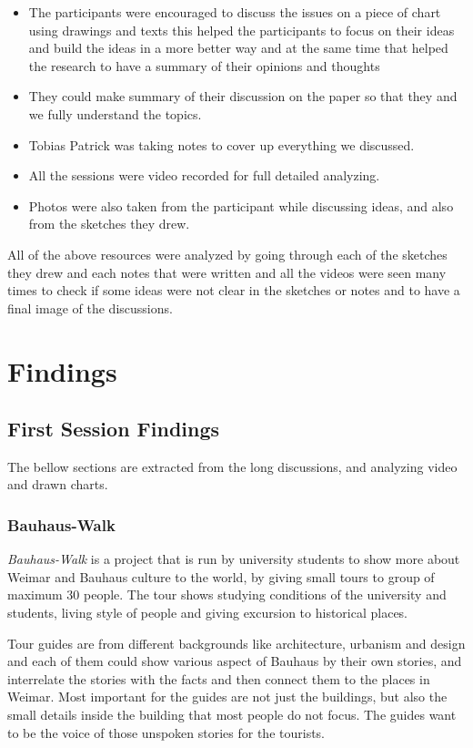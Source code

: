 \begin {itemize}
\item   The participants were encouraged to discuss the issues on a piece of chart using drawings and texts this helped the participants to focus on their ideas and build the ideas in a more better way and at the same time that helped the research to have a summary of their opinions and thoughts 
\item   They could make summary of their discussion on the paper so that they and we fully understand the topics.
\item   Tobias Patrick was taking notes to cover up everything we discussed.
\item   All the sessions were video recorded for full detailed analyzing. 
\item Photos were also taken from the participant while discussing ideas, and also from the sketches they drew.
\end{itemize}


All of the above resources were analyzed by going through each of the sketches they drew and each notes that were written and all the videos were seen many times to check if some ideas were not clear in the sketches or notes and to have a final image of the discussions.


\newpage
\section{Findings}

\subsection {First Session Findings}
The bellow sections are extracted from the long discussions, and analyzing video and drawn charts.


\subsubsection{Bauhaus-Walk}
\emph{Bauhaus-Walk} is a project that is run by university students to show more about Weimar and Bauhaus culture to the world, by giving small tours to group of maximum 30 people. The tour shows studying conditions of the university and students, living style of people and giving excursion to historical places.

Tour guides are from different backgrounds like architecture, urbanism and design and each of them could show various aspect of Bauhaus by their own stories, and interrelate the stories with the facts and then connect them to the places in Weimar. Most important for the guides are not just the buildings, but also the small details inside the building that most people do not focus. The guides want to be the voice of those unspoken stories for the tourists.

